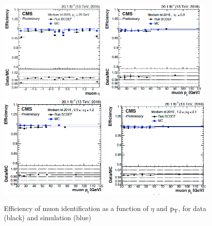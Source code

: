 \begin{figure}[!htpb]\centering
 \includegraphics[width=0.47\textwidth]{plots_and_figures/chapter4/muoneffveta.png}
 \includegraphics[width=0.49\textwidth]{plots_and_figures/chapter4/muoneffvpt1.png} \\
 \includegraphics[width=0.49\textwidth]{plots_and_figures/chapter4/muoneffvpt2.png}
 \includegraphics[width=0.49\textwidth]{plots_and_figures/chapter4/muoneffvpt3.png} 
\caption{Efficiency of muon identification as a function of $\eta$ and $\text{p}_\text{T}$, for data (black) and simulation (blue)~\cite{muon_pog}}
 \label{fig:muoneff}
\end{figure}  
  
